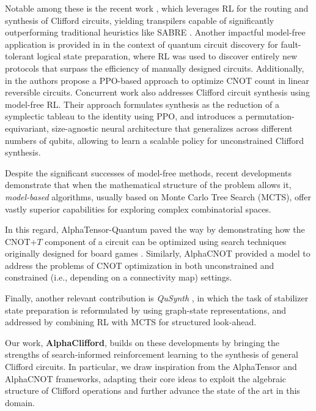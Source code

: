 \documentclass[conference]{IEEEtran}
\begin{document}
 Notable among these is the recent work \cite{KremerIBM}, which leverages RL for the routing and synthesis of Clifford circuits, yielding transpilers capable of significantly outperforming traditional heuristics like SABRE \cite{zou_lightsabre_2024}. 
 Another  impactful model-free application is provided in \cite{puviani25} in the context of quantum circuit discovery for fault-tolerant logical state preparation, where RL was used to discover entirely new protocols that surpass the efficiency of manually designed circuits.
Additionally, in \cite{romanello2025CNOT} the authors propose a PPO-based approach to optimize CNOT count in linear reversible circuits.
%
 Concurrent work \cite{equivariant_clifford} also addresses Clifford circuit synthesis using model-free RL. Their approach formulates synthesis as the reduction of a symplectic tableau to the identity using PPO, and introduces a permutation-equivariant, size-agnostic neural architecture that generalizes across different numbers of qubits, allowing to learn a scalable policy for unconstrained Clifford synthesis. 



Despite the significant successes of model-free methods, recent developments demonstrate that when the mathematical structure of the problem allows it, \textit{model-based} algorithms, usually based on Monte Carlo Tree Search \cite{coulom2007} (MCTS), offer vastly superior capabilities for exploring complex combinatorial spaces.

 In this regard, AlphaTensor-Quantum \cite{alphatensor_quantum} paved the way by demonstrating how the CNOT+$T$ component of a circuit can be optimized using search techniques originally designed for board games \cite{alphazero}. Similarly, AlphaCNOT \cite{cossio2026alphacnotlearningcnotminimization} provided a model to address the problems of CNOT optimization in both unconstrained and constrained (i.e., depending on a connectivity map) settings.

 
 Finally, another relevant contribution  is \textit{QuSynth} \cite{doherty_fast_2026}, in which the task of stabilizer state preparation is  reformulated  by using graph-state representations, and addressed by combining  RL with MCTS for structured look-ahead.


Our work, \textbf{AlphaClifford}, builds on these developments by bringing the strengths of search-informed reinforcement learning to the synthesis of general Clifford circuits. In particular, we draw inspiration from the AlphaTensor and AlphaCNOT frameworks, adapting their core ideas to exploit the algebraic structure of Clifford operations and further advance the state of the art in this domain.
\end{document}
